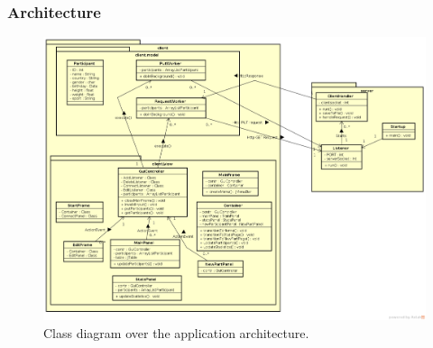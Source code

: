 \documentclass[a4paper, 11pt]{article}
\begin{document}
\subsubsection{Architecture}
\begin{figure}[H]
\includegraphics[scale=0.35]{assignment1_architecture.png}
\caption{Class diagram over the application architecture.}
\end{figure}
\end{document}
